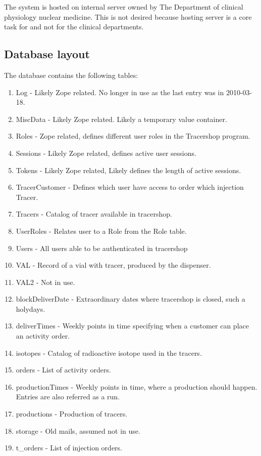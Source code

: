 \documentclass{article}
\begin{document}
The system is hosted on internal server owned by The Department of clinical physiology nuclear medicine.
This is not desired because hosting server is a core task for  and not for the clinical departments.

\subsection*{Database layout}
The database contains the following tables:
\begin{enumerate}
  \item Log - Likely Zope related. No longer in use as the last entry was in 2010-03-18.
  \item MiscData - Likely Zope related. Likely a temporary value container.
  \item Roles - Zope related, defines different user roles in the Tracershop program.
  \item Sessions - Likely Zope related, defines active user sessions.
  \item Tokens - Likely Zope related, Likely defines the length of active sessions.
  \item TracerCustomer - Defines which user have access to order which injection Tracer.
  \item Tracers - Catalog of tracer available in tracershop.
  \item UserRoles - Relates user to a Role from the Role table.
  \item Users - All users able to be authenticated in tracershop
  \item VAL - Record of a vial with tracer, produced by the dispenser.
  \item VAL2 - Not in use.
  \item blockDeliverDate - Extraordinary dates where tracershop is closed, such a holydays.
  \item deliverTimes - Weekly points in time specifying when a customer can place an activity order.
  \item isotopes - Catalog of radioactive isotope used in the tracers.
  \item orders - List of activity orders.
  \item productionTimes - Weekly points in time, where a production should happen. Entries are also referred as a run.
  \item productions - Production of tracers.
  \item storage - Old mails, assumed not in use.
  \item t\_orders - List of injection orders.
\end{enumerate}
\end{document}
